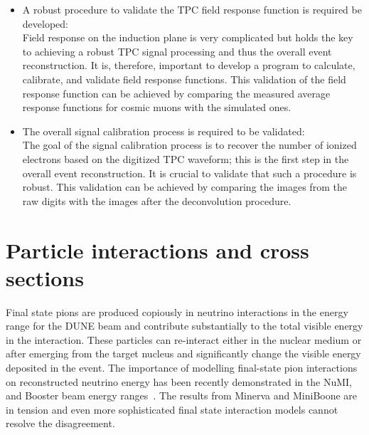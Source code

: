 \begin{itemize}
\item A robust procedure to validate the TPC field response function is required
be developed: \\
Field response on the induction plane is very complicated but holds the key to achieving a robust TPC  signal processing and thus the overall event reconstruction. It is, therefore, important to develop a 
program to calculate, calibrate, and validate field response functions. This validation of the field response function can be achieved by comparing the measured average response functions for cosmic muons with the simulated
ones. 

\item The overall signal calibration process is required to be validated: \\
The goal of the signal calibration process is to recover the number of ionized electrons based on
the digitized TPC waveform; this is the first step in the overall event reconstruction. It is crucial to validate that such a procedure is robust. 
This validation can be achieved by comparing the images from the raw digits with the images after the deconvolution procedure.

\end{itemize}




\section{Particle interactions and cross sections}



Final state pions are produced copiously in neutrino interactions in the energy range for the DUNE beam  and contribute 
substantially to the total visible energy in the interaction.
These particles can re-interact either in the nuclear medium or after emerging from the target nucleus
and significantly change the visible energy deposited in the event. 
The importance of modelling final-state pion interactions on reconstructed neutrino energy has been recently demonstrated in the NuMI, and Booster beam energy ranges~\cite{miniboonefsi, minervafsi}. The results from Minerva and MiniBoone are in tension and even more sophisticated final state interaction models cannot resolve the disagreement. 


